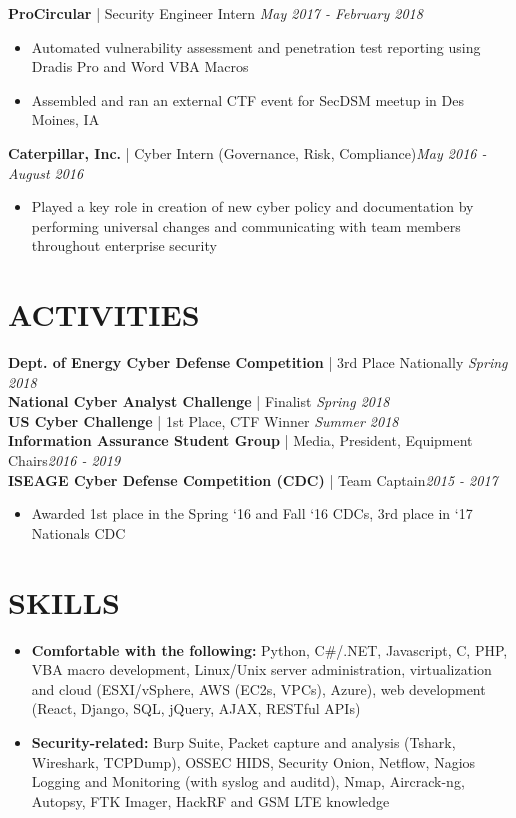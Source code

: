 \documentclass[line]{res}
\begin{document}
\begin{resume}
\textbf{ProCircular} | Security Engineer Intern \hfill \textit{May 2017 - February 2018}
\begin{itemize}
	\item Automated vulnerability assessment and penetration test reporting using Dradis Pro and Word VBA Macros
	\item Assembled and ran an external CTF event for SecDSM meetup in Des Moines, IA
\end{itemize}

\textbf{Caterpillar, Inc.} | Cyber Intern (Governance, Risk, Compliance)\hfill \textit{May 2016 - August 2016}
\begin{itemize}
	\item Played a key role in creation of new cyber policy and documentation by performing universal changes and communicating with team members throughout enterprise security
\end{itemize}

\section{ACTIVITIES}
\textbf{Dept. of Energy Cyber Defense Competition} | 3rd Place Nationally \hfill \textit{Spring 2018}\\
\textbf{National Cyber Analyst Challenge} | Finalist \hfill \textit{Spring 2018}\\
\textbf{US Cyber Challenge} | 1st Place, CTF Winner \hfill \textit{Summer 2018}\\
\textbf{Information Assurance Student Group} | Media, President, Equipment Chairs\hfill \textit{2016 - 2019}\\
\textbf{ISEAGE Cyber Defense Competition (CDC)} | Team Captain\hfill \textit{2015 - 2017}
\begin{itemize}
	\item Awarded 1st place in the Spring ‘16 and Fall ‘16 CDCs, 3rd place in ‘17 Nationals CDC
\end{itemize}

\section{SKILLS}
\begin{itemize}
	\item \textbf{Comfortable with the following:} Python, C\#/.NET, Javascript, C, PHP, VBA macro development, Linux/Unix server administration, virtualization and cloud (ESXI/vSphere, AWS (EC2s, VPCs), Azure), web development (React, Django, SQL, jQuery, AJAX, RESTful APIs)
	\item \textbf{Security-related:} Burp Suite, Packet capture and analysis (Tshark, Wireshark, TCPDump), OSSEC HIDS, Security Onion, Netflow, Nagios Logging and Monitoring (with syslog and auditd), Nmap, Aircrack-ng, Autopsy, FTK Imager, HackRF and GSM LTE knowledge
\end{itemize}

\end{resume}
\end{document}
